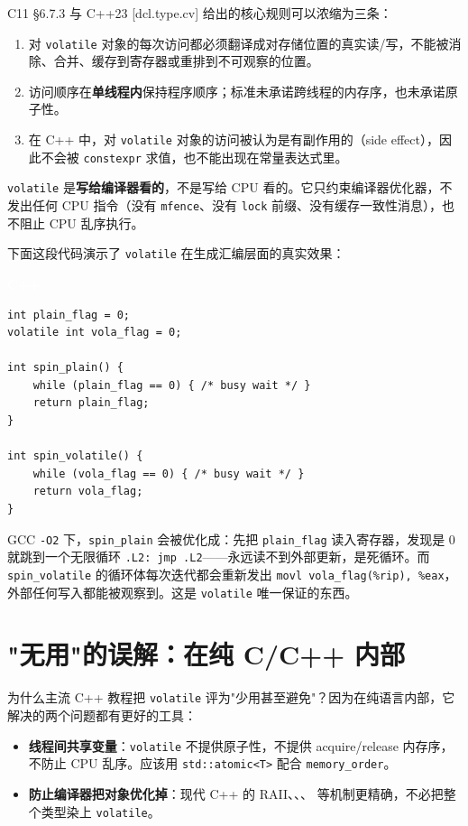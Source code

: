 \documentclass[12pt,a4paper,fontset=fandol]{ctexbook}
\newcommand{\cpplabel}{%
  \begin{tcolorbox}[enhanced,colback=cppheadbg,colframe=cppheadbg,
    arc=1mm,boxrule=0mm,left=6pt,right=6pt,top=2pt,bottom=2pt,
    halign=left,oversize]
    \textcolor{white}{\small\bfseries C++}
  \end{tcolorbox}\vspace{-4pt}}
\newcommand{\cpp}[1]{C++#1}
\newcommand{\kw}[1]{\texttt{#1}}
\begin{document}
C11 §6.7.3 与 \cpp{}23 [dcl.type.cv] 给出的核心规则可以浓缩为三条：

\begin{enumerate}[nosep]
  \item 对 \kw{volatile} 对象的每次访问都必须翻译成对存储位置的真实读/写，不能被消除、合并、缓存到寄存器或重排到不可观察的位置。
  \item 访问顺序在\textbf{单线程内}保持程序顺序；标准未承诺跨线程的内存序，也未承诺原子性。
  \item 在 \cpp{} 中，对 \kw{volatile} 对象的访问被认为是有副作用的（side effect），因此不会被 \texttt{constexpr} 求值，也不能出现在常量表达式里。
\end{enumerate}

\begin{tcolorbox}[guideline={一句话总结}]
\kw{volatile} 是\textbf{写给编译器看的}，不是写给 CPU 看的。它只约束编译器优化器，不发出任何 CPU 指令（没有 \texttt{mfence}、没有 \texttt{lock} 前缀、没有缓存一致性消息），也不阻止 CPU 乱序执行。
\end{tcolorbox}

下面这段代码演示了 \kw{volatile} 在生成汇编层面的真实效果：

\cpplabel
\begin{lstlisting}[style=cppstyle]
int plain_flag = 0;
volatile int vola_flag = 0;

int spin_plain() {
    while (plain_flag == 0) { /* busy wait */ }
    return plain_flag;
}

int spin_volatile() {
    while (vola_flag == 0) { /* busy wait */ }
    return vola_flag;
}
\end{lstlisting}

GCC \texttt{-O2} 下，\texttt{spin\_plain} 会被优化成：先把 \texttt{plain\_flag} 读入寄存器，发现是 0 就跳到一个无限循环 \texttt{.L2: jmp .L2}——永远读不到外部更新，是死循环。而 \texttt{spin\_volatile} 的循环体每次迭代都会重新发出 \texttt{movl vola\_flag(\%rip), \%eax}，外部任何写入都能被观察到。这是 \kw{volatile} 唯一保证的东西。

\section{"无用"的误解：在纯 C/C++ 内部}\label{sec:volatile-misused}

为什么主流 \cpp{} 教程把 \kw{volatile} 评为"少用甚至避免"？因为在纯语言内部，它解决的两个问题都有更好的工具：

\begin{itemize}[nosep]
  \item \textbf{线程间共享变量}：\kw{volatile} 不提供原子性，不提供 acquire/release 内存序，不防止 CPU 乱序。应该用 \texttt{std::atomic<T>} 配合 \texttt{memory\_order}。
  \item \textbf{防止编译器把对象优化掉}：现代 \cpp{} 的 RAII、、、 等机制更精确，不必把整个类型染上 \kw{volatile}。
\end{itemize}
\end{document}
